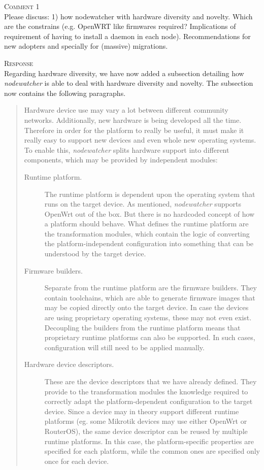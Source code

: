 \documentclass[12pt,twoside,a4paper]{report}
\newcommand{\nodewatcher}{\textit{nodewatcher}}
\begin{document}
\vspace{0.5cm}\noindent\textsc{Comment 1}\\
Please discuss: 1) how nodewatcher with hardware diversity and novelty. Which are the constrains (e.g. OpenWRT like firmwares required? Implications of requirement of having to install a daemon in each node). Recommendations for new adopters and specially for (massive) migrations.

\vspace{0.5cm}\noindent\textsc{Response}\\
Regarding hardware diversity, we have now added a subsection detailing how \nodewatcher{} is able to deal with hardware diversity and novelty.
The subsection now contains the following paragraphs.

\begin{quote}
Hardware device use may vary a lot between different community networks.
Additionally, new hardware is being developed all the time.
Therefore in order for the platform to really be useful, it must make it really easy to support new devices and even whole new operating systems.
To enable this, \nodewatcher{} splits hardware support into different components, which may be provided by independent modules:

\begin{description}
    \item[Runtime platform.] The runtime platform is dependent upon the operating system that runs on the target device.
    As mentioned, \nodewatcher{} supports OpenWrt out of the box.
    But there is no hardcoded concept of how a platform should behave.
    What defines the runtime platform are the transformation modules, which contain the logic of converting the platform-independent configuration into something that can be understood by the target device.

    \item[Firmware builders.] Separate from the runtime platform are the firmware builders.
    They contain toolchains, which are able to generate firmware images that may be copied directly onto the target device.
    In case the devices are using proprietary operating systems, these may not even exist.
    Decoupling the builders from the runtime platform means that proprietary runtime platforms can also be supported.
    In such cases, configuration will still need to be applied manually.

    \item[Hardware device descriptors.] These are the device descriptors that we have already defined.
    They provide to the transformation modules the knowledge required to correctly adapt the platform-dependent configuration to the target device.
    Since a device may in theory support different runtime platforms (eg. some Mikrotik devices may use either OpenWrt or RouterOS), the same device descriptor can be reused by multiple runtime platforms.
    In this case, the platform-specific properties are specified for each platform, while the common ones are specified only once for each device.
\end{description}


\end{quote}
\end{document}
